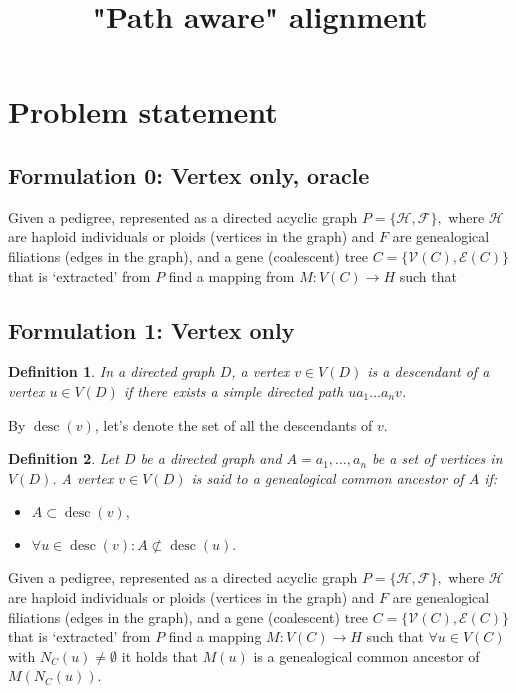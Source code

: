 \documentclass[14pt]{extarticle}
\DeclareMathOperator{\desc}{desc}
\newtheorem{definition}{Definition}
\begin{document}
	
	
\title{"Path aware" alignment}
\date{}

\section{Problem statement}
\subsection{Formulation 0: Vertex only, oracle} 
Given a pedigree, represented as a directed acyclic graph $P = \{\mathcal{H},\mathcal{F}\},$ where $\mathcal{H}$ are haploid individuals or ploids (vertices in the graph) and $F$ are genealogical filiations (edges in the graph), and a gene (coalescent) tree $C = \{\mathcal{V}(C),\mathcal{E}(C)\}$ that is `extracted' from $P$ find a mapping from $M:V(C) \rightarrow H$ such that       

\subsection{Formulation 1: Vertex only} 

\begin{definition}
	In a directed graph $D$, a vertex $v \in V(D)$ is a descendant of a vertex $u \in V(D)$ if there exists a simple directed path $ua_1 \ldots a_nv$.
\end{definition}

By $\desc(v)$, let's denote the set of all the descendants of $v$.

\begin{definition}
	
	Let $D$ be a directed graph and $A = a_1, \ldots, a_n$ be a set of vertices in $V(D)$. A vertex $v \in V(D)$ is said to a genealogical common ancestor of $A$ if:
	
	\begin{itemize}
		\item 
		$A \subset \desc(v),$
		\item 
		$\forall u \in \desc(v): A \not \subset \desc(u).$
	\end{itemize}
	
\end{definition}

Given a pedigree, represented as a directed acyclic graph $P = \{\mathcal{H},\mathcal{F}\},$ where $\mathcal{H}$ are haploid individuals or ploids (vertices in the graph) and $F$ are genealogical filiations (edges in the graph), and a gene (coalescent) tree $C = \{\mathcal{V}(C),\mathcal{E}(C)\}$ that is `extracted' from $P$ find a mapping $M:V(C) \rightarrow H$ such that 
$\forall u \in V(C)$ with $N_C(u) \ne \emptyset$ it holds that $M(u)$ is a genealogical common ancestor of $M(N_C(u))$.
\end{document}
